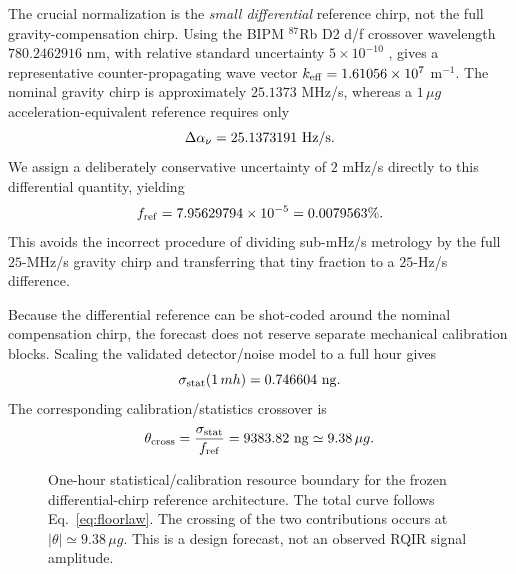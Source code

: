 The crucial normalization is the \emph{small differential} reference chirp, not the full gravity-compensation chirp. Using the BIPM $^{87}$Rb D2 d/f crossover wavelength $780.2462916$ nm, with relative standard uncertainty $5\times10^{-10}$ \cite{BIPM2015}, gives a representative counter-propagating wave vector $k_{\rm eff}=1.61056\times10^7$ m$^{-1}$. The nominal gravity chirp is approximately $25.1373$ MHz/s, whereas a $1\,\mu g$ acceleration-equivalent reference requires only
\begin{equation}
\Delta\alpha_\nu=25.1373191\ {\rm Hz/s}.
\end{equation}
We assign a deliberately conservative uncertainty of $2$ mHz/s directly to this differential quantity, yielding
\begin{equation}
f_{\rm ref}=7.95629794\times10^{-5}
=0.0079563\%.
\label{eq:fref}
\end{equation}
This avoids the incorrect procedure of dividing sub-mHz/s metrology by the full $25$-MHz/s gravity chirp and transferring that tiny fraction to a $25$-Hz/s difference.

Because the differential reference can be shot-coded around the nominal compensation chirp, the forecast does not reserve separate mechanical calibration blocks. Scaling the validated detector/noise model to a full hour gives
\begin{equation}
\sigma_{\rm stat}(1\,{
m h})=0.746604\ {\rm ng}.
\label{eq:onehour}
\end{equation}
The corresponding calibration/statistics crossover is
\begin{equation}
\theta_{\rm cross}=\frac{\sigma_{\rm stat}}{f_{\rm ref}}
=9383.82\ {\rm ng}\simeq9.38\,\mu g.
\label{eq:crossover}
\end{equation}

\begin{figure}[t]
\centering
{}
\caption{One-hour statistical/calibration resource boundary for the frozen differential-chirp reference architecture. The total curve follows Eq.~\eqref{eq:floorlaw}. The crossing of the two contributions occurs at $|\theta|\simeq9.38\,\mu g$. This is a design forecast, not an observed RQIR signal amplitude.}
\label{fig:crossover}
\end{figure}

